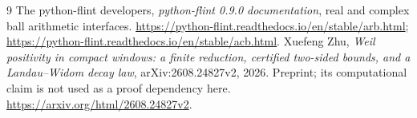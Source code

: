 \documentclass[11pt]{article}
\begin{document}
\begin{thebibliography}{9}
 The python-flint developers, \emph{python-flint 0.9.0 documentation}, real and complex ball arithmetic interfaces. \url{https://python-flint.readthedocs.io/en/stable/arb.html}; \url{https://python-flint.readthedocs.io/en/stable/acb.html}.
 Xuefeng Zhu, \emph{Weil positivity in compact windows: a finite reduction, certified two-sided bounds, and a Landau--Widom decay law}, arXiv:2608.24827v2, 2026. Preprint; its computational claim is not used as a proof dependency here. \url{https://arxiv.org/html/2608.24827v2}.
\end{thebibliography}
\end{document}
